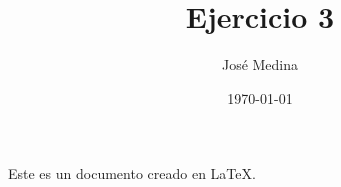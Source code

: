 \documentclass{article}
\begin{document}
\title{Ejercicio 3}
\author{José Medina}
\date{\today}

\maketitle

Este es un documento creado en LaTeX.
\end{document}
